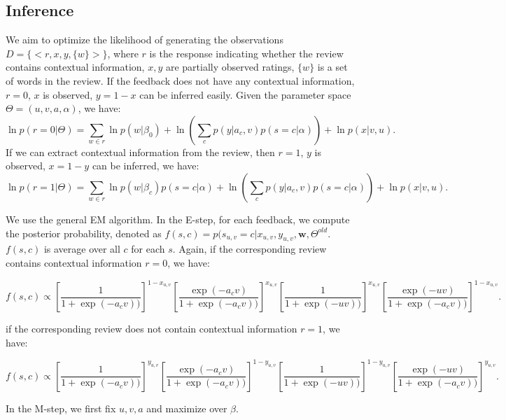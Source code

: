 \documentclass{llncs}
\begin{document}
\subsection{Inference}
We aim to optimize the likelihood of generating the observations $D=\{<r,x,y,\{w\}>\}$, where $r$ is the response indicating whether the review contains contextual information, $x,y$ are partially observed ratings, $\{w\}$ is a set of words in the review. If the feedback does not have any contextual information, $r=0$, $x$ is observed, $y=1-x$ can be inferred easily.  Given the parameter space $\Theta=(u,v,a,\alpha)$, we have: 
\begin{equation}\label{equ:likelihoodmissing}
\ln p(r=0|\Theta)= \sum_{w\in r} \ln p(w|\beta_0) + \ln (\sum_c p(y|a_c,v)p(s=c|\alpha)) + \ln p(x|v,u).
\end{equation}
If we can extract contextual information from the review, then $r=1$, $y$ is observed, $x=1-y$ can be inferred, we have:
\begin{equation}\label{equ:likelihood}
\ln p(r=1|\Theta)= \sum_{w\in r} \ln p(w|\beta_c) p(s=c|\alpha) + \ln (\sum_c p(y|a_c,v)p(s=c|\alpha)) + \ln p(x|v,u).
\end{equation}

We use the general EM algorithm. In the E-step, for each feedback, we compute the posterior probability, denoted as $f(s,c)=p(s_{u,v}=c|x_{u,v},y_{u,v},\mathbf{w},\Theta^{old}$.  $f(s,c)$ is average over all $c$ for each $s$. Again, if the corresponding review contains contextual information $r=0$, we have:

\begin{equation}\label{equ:estep1}
f(s,c)\propto [\frac{1}{1+\exp{(-a_c v) })}]^{1-x_{u,v}} [\frac{\exp{(-a_c v)}}{1+\exp{(-a_c v) })}]^{x_{u,v}} [\frac{1}{1+\exp{(-u v) })}]^{x_{u,v}} [\frac{\exp{(-uv)}}{1+\exp{(-a_c v) })}]^{1-x_{u,v}}.
\end{equation}

if the corresponding review does not contain contextual information $r=1$, we have:

\begin{equation}\label{equ:estep2}
f(s,c)\propto [\frac{1}{1+\exp{(-a_c v) })}]^{y_{u,v}} [\frac{\exp{(-a_c v)}}{1+\exp{(-a_c v) })}]^{1-y_{u,v}} [\frac{1}{1+\exp{(-u v) })}]^{1-y_{u,v}} [\frac{\exp{(-uv)}}{1+\exp{(-a_c v) })}]^{y_{u,v}}.
\end{equation}

In the M-step, we first fix $u,v,a$ and maximize over $\beta$.
\end{document}
